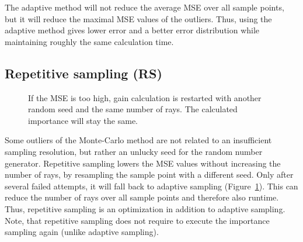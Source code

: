 The adaptive method will not reduce the average MSE over all sample points,
but it will reduce the maximal MSE values of the outliers. Thus, using the adaptive
method gives lower error and a better error distribution while maintaining
roughly the same calculation time.


\subsection{Repetitive sampling (RS)}
\begin{figure}[H]
  \centerline
  {}
  \caption{If the MSE is too high, gain calculation is restarted with another
    random seed and the same number of rays. The calculated importance will stay the same.}
  \label{graphic:pap4}
\end{figure}
Some outliers of the Monte-Carlo method are not related to an insufficient
sampling resolution, but rather an unlucky seed for the random number generator.
Repetitive sampling lowers the MSE values without increasing the number of rays,
by resampling the sample point with a different seed. Only after several failed attempts, it will fall back to adaptive
sampling (Figure~\ref{graphic:pap4}). This can reduce the number of rays over all sample points and therefore
also runtime. Thus, repetitive sampling is an optimization in addition to adaptive sampling. 
Note, that repetitive sampling does not require to execute the importance
sampling again (unlike adaptive sampling).

